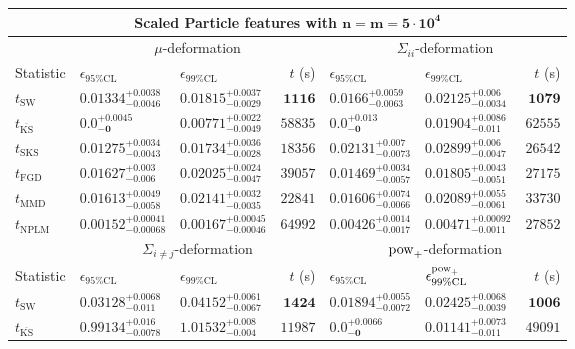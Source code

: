 \begin{tabular}{l|llr|llr}
	\toprule
	\multicolumn{7}{c}{{\bf Scaled Particle features with $\mathbf{n=m=5\cdot 10^{4}}$}} \\
	\toprule
	\multicolumn{1}{c}{} & \multicolumn{3}{c}{$\mu$-deformation} & \multicolumn{3}{c}{$\Sigma_{ii}$-deformation} \\
	Statistic & $\epsilon_{95\%\mathrm{CL}}$ & $\epsilon_{99\%\mathrm    {CL}}$ & $t$ (s) & $\epsilon_{95\%\mathrm{CL}}$ & $\epsilon_{99\%\mathrm{CL}}$ & $t$ (s) \\
	\midrule
	$t_{\mathrm{SW}}$ & $0.01334_{-0.0046}^{+0.0038}$ & $0.01815_{-0.0029}^{+0.0037}$ & ${\mathbf{1116}}$ & $0.0166_{-0.0063}^{+0.0059}$ & $0.02125_{-0.0034}^{+0.006}$ & ${\mathbf{1079}}$ \\
	$t_{\overline{\mathrm{KS}}}$ & ${\mathbf{0.0_{-0}^{+0.0045}}}$ & ${\mathbf{0.00771_{-0.0049}^{+0.0022}}}$ & $58835$ & ${\mathbf{0.0_{-0}^{+0.013}}}$ & $0.01904_{-0.011}^{+0.0086}$ & $62555$ \\
	$t_{\mathrm{SKS}}$ & $0.01275_{-0.0043}^{+0.0034}$ & $0.01734_{-0.0028}^{+0.0036}$ & $18356$ & $0.02131_{-0.0073}^{+0.007}$ & $0.02899_{-0.0047}^{+0.006}$ & $26542$ \\
	$t_{\mathrm{FGD}}$ & $0.01627_{-0.006}^{+0.003}$ & $0.02025_{-0.0047}^{+0.0024}$ & $39057$ & $0.01469_{-0.0057}^{+0.0034}$ & ${\mathbf{0.01805_{-0.0051}^{+0.0043}}}$ & $27175$ \\
	$t_{\mathrm{MMD}}$ & $0.01613_{-0.0058}^{+0.0049}$ & $0.02141_{-0.0035}^{+0.0032}$ & $22841$ & $0.01606_{-0.0066}^{+0.0074}$ & $0.02089_{-0.0061}^{+0.0055}$ & $33730$ \\
\rowcolor{red!35}	$t_{\mathrm{NPLM}}$ & $0.00152_{-0.00068}^{+0.00041}$ & $0.00167_{-0.00046}^{+0.00045}$ & $64992$ & $0.00426_{-0.0017}^{+0.0014}$ & $0.00471_{-0.0011}^{+0.00092}$ & $27852$ \\
	\toprule
	\multicolumn{1}{c}{} & \multicolumn{3}{c}{$\Sigma_{i\neq j}$-deformation} & \multicolumn{3}{c}{$\rm{pow}_{+}$-deformation} \\
	Statistic & $\epsilon_{95\%\mathrm{CL}}$ & $\epsilon_{99\%\mathrm{CL}}$ & $t$ (s) & $\epsilon_{95\%\mathrm{CL}}$ & $\epsilon^{\rm   {pow}_{+}}_{99\%\mathrm{CL}}$ & $t$ (s) \\
	\midrule
	$t_{\mathrm{SW}}$ & $0.03128_{-0.011}^{+0.0068}$ & $0.04152_{-0.0067}^{+0.0061}$ & ${\mathbf{1424}}$ & $0.01894_{-0.0072}^{+0.0055}$ & $0.02425_{-0.0039}^{+0.0068}$ & ${\mathbf{1006}}$ \\
	$t_{\overline{\mathrm{KS}}}$ & $0.99134_{-0.0078}^{+0.016}$ & $1.01532_{-0.004}^{+0.008}$ & $11987$ & ${\mathbf{0.0_{-0}^{+0.0066}}}$ & ${\mathbf{0.01141_{-0.011}^{+0.0073}}}$ & $49091$ \\

\end{tabular}
